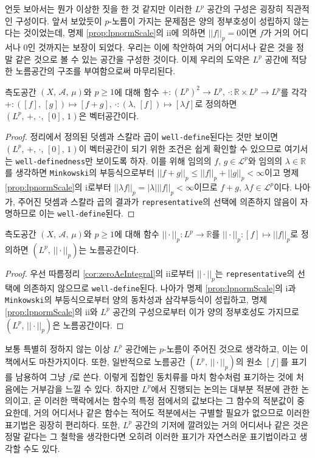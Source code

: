 언듯 보아서는 뭔가 이상한 짓을 한 것 같지만 이러한 $L^p$ 공간의 구성은 굉장히 직관적인 구성이다. 앞서 보았듯이 $p$-노름이 가지는 문제점은 양의 정부호성이 성립하지 않는다는 것이었는데, 명제 \ref{prop:lpnormScale}의 ii에 의하면 $||f||_p=0$이면 $f$가 거의 어디서나 0인 것까지는 보장이 되었다. 우리는 이에 착안하여 거의 어디서나 같은 것을 정말 같은 것으로 볼 수 있는 공간을 구성한 것이다. 이제 우리의 도약은 $L^p$ 공간에 적당한 노름공간의 구조를 부여함으로써 마무리된다.

\begin{proposition}
    측도공간 $(X,\,\mathcal{A},\,\mu)$와 $p\geq1$에 대해 함수 $+:(L^p)^2\to L^p,\,\cdot:\mathbb{R}\times L^p\to L^p$를 각각 $+:([f],\,[g])\mapsto[f+g],\,\cdot:(\lambda,\,[f])\mapsto[\lambda f]$로 정의하면 $(L^p,\,+,\,\cdot,\,[0],\,1)$은 벡터공간이다.
\end{proposition}

\begin{proof}
    정리에서 정의된 덧셈과 스칼라 곱이 \texttt{well-define}된다는 것만 보이면 $(L^p,\,+,\,\cdot,\,[0],\,1)$이 벡터공간이 되기 위한 조건은 쉽게 확인할 수 있으므로 여기서는 \texttt{well-definedness}만 보이도록 하자. 이를 위해 임의의 $f,\,g\in\mathcal{L}^p$와 임의의 $\lambda\in\mathbb{R}$를 생각하면 \texttt{Minkowski}의 부등식으로부터 $||f+g||_p\leq||f||_p+||g||_p<\infty$이고 명제 \ref{prop:lpnormScale}의 i로부터 $||\lambda f||_p=|\lambda|||f||_p<\infty$이므로 $f+g,\,\lambda f\in\mathcal{L}^p$이다. 나아가, 주어진 덧셈과 스칼라 곱의 결과가 \texttt{representative}의 선택에 의존하지 않음이 자명하므로 이는 \texttt{well-define}된다.
\end{proof}

\begin{proposition}
    측도공간 $(X,\,\mathcal{A},\,\mu)$와 $p\geq1$에 대해 함수 $||\cdot||_p:L^p\to\mathbb{R}$를 $||\cdot||_p:[f]\mapsto||f||_p$로 정의하면 $(L^p,\,||\cdot||_p)$는 노름공간이다.
\end{proposition}

\begin{proof}
    우선 따름정리 \ref{cor:zeroAeIntegral}의 ii로부터 $||\cdot||_p$는 \texttt{representative}의 선택에 의존하지 않으므로 \texttt{well-define}된다. 나아가 명제 \ref{prop:lpnormScale}의 i과 \texttt{Minkowski}의 부등식으로부터 양의 동차성과 삼각부등식이 성립하고, 명제 \ref{prop:lpnormScale}의 ii와 $L^p$ 공간의 구성으로부터 이가 양의 정부호성도 가지므로 $(L^p,\,||\cdot||_p)$은 노름공간이다.
\end{proof}

보통 특별히 정하지 않는 이상 $L^p$ 공간에는 $p$-노름이 주어진 것으로 생각하고, 이는 이 책에서도 마찬가지이다. 또한, 일반적으로 노름공간 $(L^p,\,||\cdot||_p)$의 원소 $[f]$를 표기를 남용하여 그냥 $f$로 쓴다. 이렇게 집합인 동치류를 마치 함수처럼 표기하는 것에 처음에는 거부감을 느낄 수 있다. 하지만 $L^p$에서 진행되는 논의는 대부분 적분에 관한 논의이고, 곧 이러한 맥락에서는 함수의 특정 점에서의 값보다는 그 함수의 적분값이 중요한데, 거의 어디서나 같은 함수는 적어도 적분에서는 구별할 필요가 없으므로 이러한 표기법은 굉장히 편리하다. 또한, $L^p$ 공간의 기저에 깔려있는 거의 어디서나 같은 것은 정말 같다는 그 철학을 생각한다면 오히려 이러한 표기가 자연스러운 표기법이라고 생각할 수도 있다.

